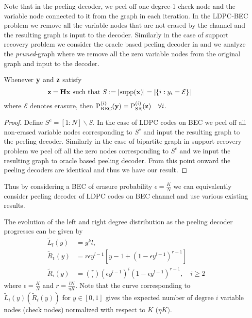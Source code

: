Note that in the peeling decoder, we peel off one degree-1 check node and the variable node connected to it from the graph in each iteration. In the LDPC-BEC problem we remove all the variable nodes that are not erased by the channel and the resulting graph is input to the decoder. Similarly in the case of support recovery problem we consider the  oracle based peeling decoder in \cite{li2015subdraft} and we analyze the \textit{pruned}-graph where we remove all the zero variable nodes from the original graph and input to the decoder.

\begin{lemma}
\label{Lemma:Equiv_LDPC_BEC}
Whenever $\mathbf{y}$ and $\mathbf{z}$ satisfy
\begin{align*}
\mathbf{z=Hx} \text{ such that  } S:=|\text{supp}(\mathbf{x})|=|\{i:y_i=\mathcal{E}\}|  \qquad
\end{align*}
where $\mathcal{E}$ denotes erasure, then $\text{P}_{\text{BEC}}^{(i)}(\mathbf{y})=\text{P}_{\text{SR}}^{(i)}(\mathbf{z}) \quad \forall i$.
\end{lemma}
\begin{proof}
Define $S^c=[1:N]\backslash S$. In the case of LDPC codes on BEC we peel off all non-erased variable nodes corresponding to $S^c$  and input the resulting graph to the peeling decoder. Similarly in the case of bipartite graph in support recovery problem we peel off all the zero nodes corresponding to $S^c$ and we input the resulting graph to oracle based peeling decoder. From this point onward the peeling decoders are identical and thus we have our result.
\end{proof}
\vspace{1ex}
Thus by considering a BEC of erasure probability $\epsilon=\frac{K}{N}$ we can equivalently consider peeling decoder of LDPC codes on BEC channel and use various existing results.
\begin{lemma}
\label{lem:RightDegEvolution}
The evolution of the left and right degree distribution as the peeling decoder progresses can be given by
\begin{align*}
\tilde{L}_l(y)&= y^kl,\\
\tilde{R}_{1}(y)&=r\epsilon y^{l-1}[y-1+ (1-\epsilon y^{l-1})^{r-1}]\\
\tilde{R}_{i}(y)&=\binom{r}{i}(\epsilon y^{l-1})^i (1-\epsilon y^{l-1})^{r-1}, \quad i\geq 2
\end{align*}
where $\epsilon=\frac{K}{N}$ and $r=\frac{lN}{\eta K}$. Note that the curve corresponding to $\tilde{L}_i(y)(\tilde{R}_{i}(y))$ for $y\in[0,1]$ gives the expected number of degree $i$ variable nodes (check nodes) normalized with respect to $K$ ($\eta K)$.
\end{lemma}
